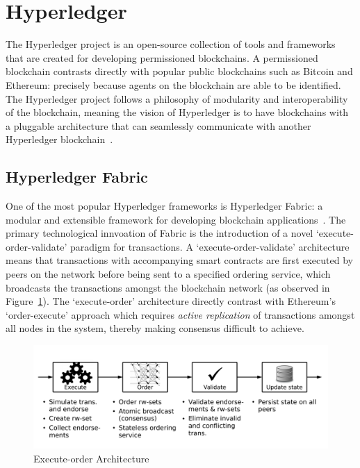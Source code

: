 \section{Hyperledger}
The Hyperledger project is an open-source collection of tools and
frameworks that are created for developing permissioned blockchains.
A permissioned blockchain contrasts directly with popular
public blockchains such as Bitcoin and Ethereum: precisely
because agents on the blockchain are able to be identified.
The Hyperledger project follows a philosophy of modularity
and interoperability of the blockchain, meaning the
vision of Hyperledger is to have blockchains with a pluggable architecture
that can seamlessly communicate with another Hyperledger blockchain~\cite{hypa}.

\subsection{Hyperledger Fabric}
One of the most popular Hyperledger frameworks is Hyperledger Fabric:
a modular and extensible framework for developing blockchain
applications~\cite{And18}. The primary technological innvoation of
Fabric is the introduction of a novel `execute-order-validate' paradigm
for transactions. A `execute-order-validate' architecture means that
transactions with accompanying smart contracts are first
executed by peers on the network before being sent to a specified
ordering service, which broadcasts the transactions amongst the blockchain
network (as observed in Figure~\ref{fig:exe}).
The `execute-order' architecture directly contrast with
Ethereum's `order-execute' approach which requires \textit{active replication}
of transactions amongst all nodes in the system, thereby making consensus
difficult to achieve.

\begin{figure}[H]
    \centering
    \includegraphics[scale=0.5]{photos/execute.png}
    \caption{Execute-order Architecture}
    \label{fig:exe}
\end{figure}

